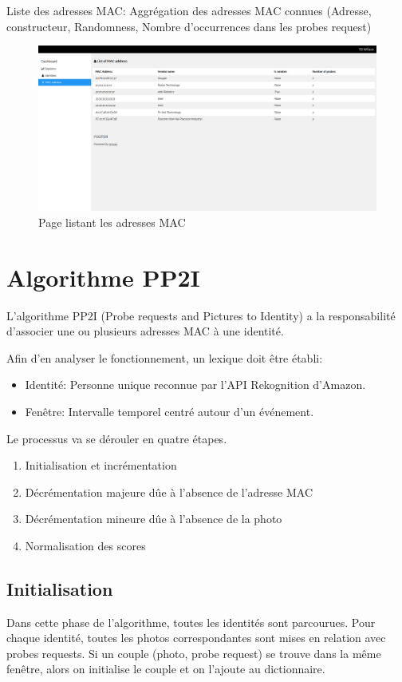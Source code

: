 Liste des adresses MAC: Aggrégation des adresses MAC connues (Adresse, constructeur, Randomness, Nombre d'occurrences dans les probes request)
\begin{figure}[H]
	\centering
	\includegraphics[width=16cm]{images/dashboard/list-macs.png}
	\caption{Page listant les adresses MAC}
	\label{fig:dashboard_stats}
\end{figure}

\section{Algorithme PP2I}
L'algorithme PP2I (Probe requests and Pictures to Identity) a la responsabilité d'associer une ou plusieurs adresses MAC à une identité. 

Afin d'en analyser le fonctionnement, un lexique doit être établi:
\begin{itemize}
	\item Identité: Personne unique reconnue par l'API Rekognition d'Amazon.
	\item Fenêtre: Intervalle temporel centré autour d'un événement. 
\end{itemize}

Le processus va se dérouler en quatre étapes. 
\begin{enumerate}
	\item Initialisation et incrémentation
	\item Décrémentation majeure dûe à l'absence de l'adresse MAC
	\item Décrémentation mineure dûe à l'absence de la photo
	\item Normalisation des scores
\end{enumerate}

\subsection{Initialisation}
Dans cette phase de l'algorithme, toutes les identités sont parcourues.
Pour chaque identité, toutes les photos correspondantes sont mises en relation avec probes requests.
Si un couple (photo, probe request) se trouve dans la même fenêtre, alors on initialise le couple et on l'ajoute au dictionnaire.


